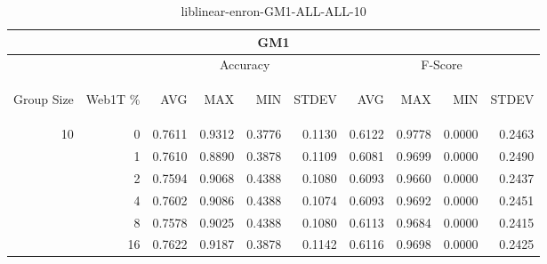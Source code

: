 \begin{center}
\begin{table}[htbp]
\begin{tabular}{ | r | r | r | r | r | r | r | r | r | r |}
\hline
\multicolumn{10}{|c|}{GM1}\\
\hline
 & & \multicolumn{4}{|c|}{Accuracy} & \multicolumn{4}{|c|}{F-Score}\\ \cline{3-10}
\begin{sideways}Group Size\end{sideways} & \begin{sideways}Web1T \%\end{sideways} & \begin{sideways}AVG\end{sideways} & \begin{sideways}MAX\end{sideways} & \begin{sideways}MIN\end{sideways} & \begin{sideways}STDEV\end{sideways} & \begin{sideways}AVG\end{sideways} & \begin{sideways}MAX\end{sideways} & \begin{sideways}MIN\end{sideways} & \begin{sideways}STDEV\end{sideways}\\
\hline
\multirow{6}{*}{10}
 & 0 & 0.7611 & 0.9312 & 0.3776 & 0.1130 & 0.6122 & 0.9778 & 0.0000 & 0.2463\\ \cline{2-10}
 & 1 & 0.7610 & 0.8890 & 0.3878 & 0.1109 & 0.6081 & 0.9699 & 0.0000 & 0.2490\\ \cline{2-10}
 & 2 & 0.7594 & 0.9068 & 0.4388 & 0.1080 & 0.6093 & 0.9660 & 0.0000 & 0.2437\\ \cline{2-10}
 & 4 & 0.7602 & 0.9086 & 0.4388 & 0.1074 & 0.6093 & 0.9692 & 0.0000 & 0.2451\\ \cline{2-10}
 & 8 & 0.7578 & 0.9025 & 0.4388 & 0.1080 & 0.6113 & 0.9684 & 0.0000 & 0.2415\\ \cline{2-10}
 & 16 & 0.7622 & 0.9187 & 0.3878 & 0.1142 & 0.6116 & 0.9698 & 0.0000 & 0.2425\\ \cline{2-10}
\hline
\end{tabular}
\caption{liblinear-enron-GM1-ALL-ALL-10}
\end{table}
\end{center}

